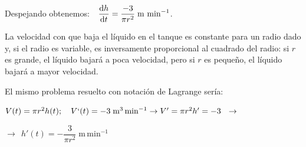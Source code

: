 \begin{miejercicio}
\vspace{3mm} Despejando obtenemos: $\ \ \displaystyle  \dv {h}{t}=\frac {-3}{\pi r^2}\; \mathrm{m\ min}^{-1}$.
	
\vspace{5mm}La velocidad con que baja el líquido en el tanque es constante para un radio dado y, si el radio es variable,  es inversamente proporcional al cuadrado del radio: si $r$ es grande, el líquido bajará a poca velocidad, pero si $r$ es pequeño, el líquido bajará a mayor velocidad.
	
\vspace{5mm}\textcolor{gris}{El mismo problema resuelto con notación de Lagrange sería:}
	
\vspace{3mm}\textcolor{gris}{$V(t)=\pi r^2 h(t); \quad V`(t)=-3\; \mathrm{m}^3\,\mathrm{min}^{-1} \to V'= \pi r^2 h'=-3 \ \ \to$}

\vspace{2mm}\textcolor{gris}{$\to \ \ h'(t)=-\dfrac 3 {\pi r^2}\; \mathrm{m\,min}^{-1} $}

\end{miejercicio}







